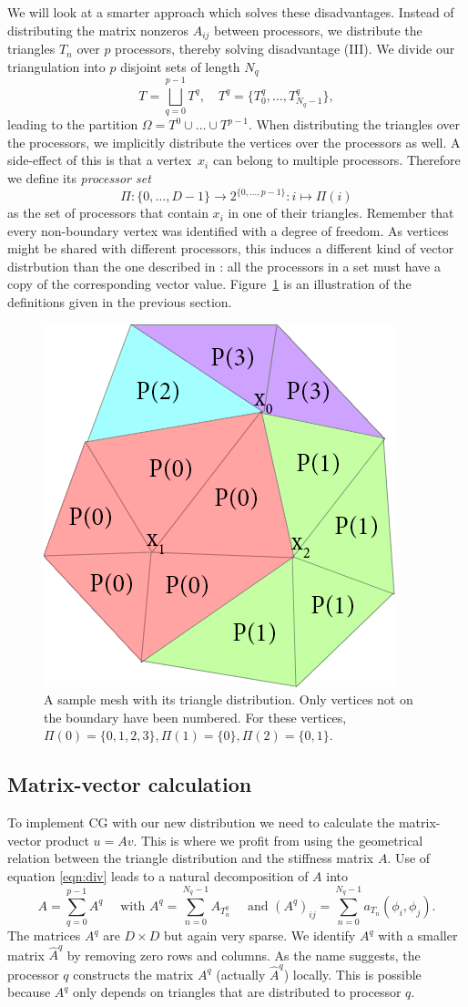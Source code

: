 \documentclass[11pt]{amsart}
\theoremstyle{definition}
\begin{document}
We will look at a smarter approach which solves these disadvantages. Instead of distributing the matrix nonzeros $A_{ij}$ between processors, we distribute the triangles $T_n$ over $p$ processors, thereby solving disadvantage (III). We divide our triangulation into $p$ disjoint sets of length $N_q$
\[
  T = \bigsqcup_{q=0}^{p-1} T^q, \quad T^q = \{ T^q_0, \ldots, T^q_{N_q-1} \},
\]
leading to the partition $\Omega = T^0 \cup \dots \cup T^{p-1}$. When distributing the triangles over the processors, we implicitly distribute the vertices over the processors as well.  A side-effect of this is that a vertex~$x_i$ can belong to multiple processors. Therefore we define its \emph{processor set} 
\[
  \Pi: \{0, \ldots, D-1\} \to 2^{\{0, \ldots, p-1\}}: i \mapsto \Pi(i)
\]
as the set of processors that contain $x_i$ in one of their triangles. Remember that every non-boundary vertex was identified with a degree of freedom. As vertices might be shared with different processors, this induces a different kind of vector distrbution than the one described in \cite[Ch.~4]{biss04}: all the processors in a set must have a copy of the corresponding vector value.
Figure~\ref{fig:procset} is an illustration of the definitions given in the previous section. 

\begin{figure}
  \includegraphics[width=0.5\linewidth]{procset.png}
  \caption{A sample mesh with its triangle distribution. Only vertices not on the boundary have been numbered. For these vertices, $\Pi(0) = \{0, 1, 2, 3\}, \Pi(1) = \{0\}, \Pi(2) = \{0, 1\}$.}
  \label{fig:procset}
\end{figure}
\subsection{Matrix-vector calculation}
To implement CG with our new distribution we need to calculate the matrix-vector product $u = Av$. This is where we profit from using the geometrical relation between the triangle distribution and the stiffness matrix $A$. Use of equation \eqref{eqn:div} leads to a natural decomposition of $A$ into
\[
	A = \sum_{q=0}^{p-1} A^q\quad \text{ with } A^q= \sum_{n=0}^{N_q-1} A_{T^q_n} \quad \text{ and } (A^q)_{ij} = \sum_{n=0}^{N_q-1} a_{T_n}(\phi_i,\phi_j).
\]
The matrices $A^q$ are $D \times D$ but again very sparse. We identify $A^q$ with a smaller matrix $\hat A^q$ by removing zero rows and columns. As the name suggests, the processor $q$ constructs the matrix $A^q$ (actually $\hat A^q$) locally. This is possible because $A^q$ only depends on triangles that are distributed to processor $q$.
\end{document}
